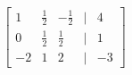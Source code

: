 \documentclass[preview]{standalone}
\begin{document}
\begin{align*}
\begin{bmatrix} 1 & \frac{1}{2} & -\frac{1}{2} & | & 4 \\ 0 & \frac{1}{2} & \frac{1}{2} & | & 1 \\ -2 & 1 & 2 & | & -3 \end{bmatrix}\\
\end{align*}
\end{document}
